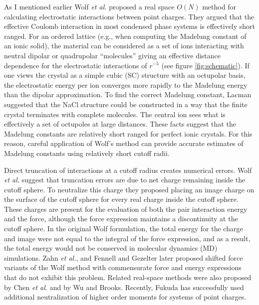 As I mentioned earlier Wolf \textit{et al.}\cite{Wolf99} proposed a real space $O(N)$ method for calculating electrostatic interactions between point charges. They argued that the effective Coulomb interaction in most condensed phase systems is effectively short
ranged.\cite{Wolf92,Wolf95} For an ordered lattice (e.g., when
computing the Madelung constant of an ionic solid), the material can
be considered as a set of ions interacting with neutral dipolar or
quadrupolar ``molecules'' giving an effective distance dependence for
the electrostatic interactions of $r^{-5}$ (see figure
\ref{fig:schematic}). If one views the  crystal as a simple
cubic (SC) structure with an octupolar  basis, the
electrostatic energy per ion converges more rapidly to the Madelung
energy than the dipolar approximation.\cite{Wolf92} To find the
correct Madelung constant, Lacman suggested that the NaCl structure
could be constructed in a way that the finite crystal terminates with
complete  molecules.\cite{Lacman65} The central ion sees
what is effectively a set of octupoles at large distances. These facts
suggest that the Madelung constants are relatively short ranged for
perfect ionic crystals.\cite{Wolf99} For this reason, careful
application of Wolf's method can provide accurate estimates of
Madelung constants using relatively short cutoff radii.

Direct truncation of interactions at a cutoff radius creates numerical
errors.  Wolf \textit{et al.} suggest that truncation errors are due
to net charge remaining inside the cutoff sphere.\cite{Wolf99} To
neutralize this charge they proposed placing an image charge on the
surface of the cutoff sphere for every real charge inside the cutoff sphere. These charges are present for the evaluation of both the pair
interaction energy and the force, although the force expression
maintains a discontinuity at the cutoff sphere.  In the original Wolf
formulation, the total energy for the charge and image were not equal
to the integral of the force expression, and as a result, the total
energy would not be conserved in molecular dynamics (MD)
simulations.\cite{Zahn02} Zahn \textit{et al.}, and Fennell and
Gezelter later proposed shifted force variants of the Wolf method with
commensurate force and energy expressions that do not exhibit this
problem.\cite{Zahn0,Gezelter06} Related real-space methods
were also proposed by Chen \textit{et al.} \cite{Chen04,Chen06,Denesyuk08,Rodgers06}
and by Wu and Brooks.\cite{Wu05} Recently, Fukuda has successfully
used additional neutralization of higher order moments for systems of
point charges.\cite{Fukuda13}

